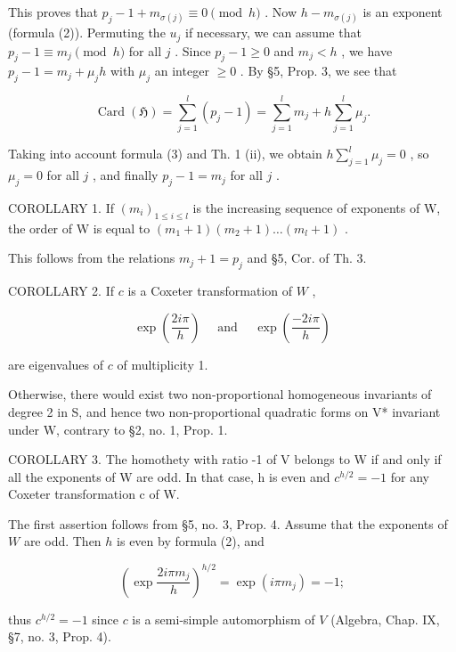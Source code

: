 This proves that \(p_j - 1 + m_{\sigma(j)} \equiv 0 \pmod{h}\) . Now \(h - m_{\sigma(j)}\) is an exponent (formula (2)). Permuting the \(u_j\) if necessary, we can assume that \(p_j - 1 \equiv m_j \pmod{h}\) for all \(j\) . Since \(p_j - 1 \geqslant 0\) and \(m_j < h\) , we have \(p_j - 1 = m_j + \mu_j h\) with \(\mu_j\) an integer \(\geqslant 0\) . By §5, Prop. 3, we see that

\[
\operatorname{Card} (\mathfrak {H}) = \sum_ {j = 1} ^ {l} (p _ {j} - 1) = \sum_ {j = 1} ^ {l} m _ {j} + h \sum_ {j = 1} ^ {l} \mu_ {j}.
\]

Taking into account formula (3) and Th. 1 (ii), we obtain \(h \sum_{j=1}^{l} \mu_j = 0\) , so \(\mu_j = 0\) for all \(j\) , and finally \(p_j - 1 = m_j\) for all \(j\) .

COROLLARY 1. If \((m_i)_{1\leqslant i\leqslant l}\) is the increasing sequence of exponents of W, the order of W is equal to \((m_1 + 1)(m_2 + 1)\ldots (m_l + 1)\) .

This follows from the relations \(m_j + 1 = p_j\) and §5, Cor. of Th. 3.

COROLLARY 2. If \(c\) is a Coxeter transformation of \(W\) ,

\[
\exp \left(\frac {2 i \pi}{h}\right) \quad \text { and } \quad \exp \left(\frac {- 2 i \pi}{h}\right)
\]

are eigenvalues of \(c\) of multiplicity 1.

Otherwise, there would exist two non-proportional homogeneous invariants of degree 2 in S, and hence two non-proportional quadratic forms on V* invariant under W, contrary to §2, no. 1, Prop. 1.

COROLLARY 3. The homothety with ratio -1 of V belongs to W if and only if all the exponents of W are odd. In that case, h is even and \(c^{h/2} = -1\) for any Coxeter transformation c of W.

The first assertion follows from §5, no. 3, Prop. 4. Assume that the exponents of \(W\) are odd. Then \(h\) is even by formula (2), and

\[
\left(\exp \frac {2 i \pi m _ {j}}{h}\right) ^ {h / 2} = \exp (i \pi m _ {j}) = - 1;
\]

thus \(c^{h/2} = -1\) since \(c\) is a semi-simple automorphism of \(V\) (Algebra, Chap. IX, §7, no. 3, Prop. 4).

